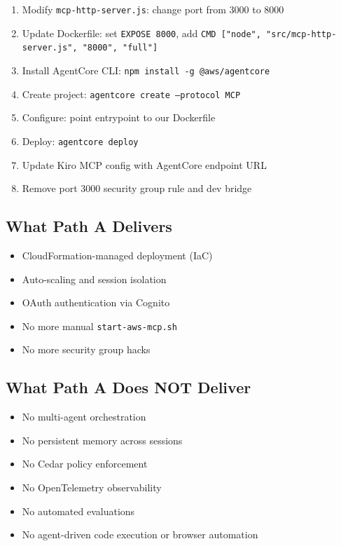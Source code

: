 \documentclass[11pt,letterpaper]{article}
\begin{document}
\begin{enumerate}[noitemsep]
    \item Modify \texttt{mcp-http-server.js}: change port from 3000 to 8000
    \item Update Dockerfile: set \texttt{EXPOSE 8000}, add
          \texttt{CMD ["node", "src/mcp-http-server.js", "8000", "full"]}
    \item Install AgentCore CLI: \texttt{npm install -g @aws/agentcore}
    \item Create project: \texttt{agentcore create --protocol MCP}
    \item Configure: point entrypoint to our Dockerfile
    \item Deploy: \texttt{agentcore deploy}
    \item Update Kiro MCP config with AgentCore endpoint URL
    \item Remove port 3000 security group rule and dev bridge
\end{enumerate}

\subsection{What Path A Delivers}

\begin{itemize}[noitemsep]
    \item CloudFormation-managed deployment (IaC)
    \item Auto-scaling and session isolation
    \item OAuth authentication via Cognito
    \item No more manual \texttt{start-aws-mcp.sh}
    \item No more security group hacks
\end{itemize}

\subsection{What Path A Does NOT Deliver}

\begin{itemize}[noitemsep]
    \item No multi-agent orchestration
    \item No persistent memory across sessions
    \item No Cedar policy enforcement
    \item No OpenTelemetry observability
    \item No automated evaluations
    \item No agent-driven code execution or browser automation
\end{itemize}
\end{document}
